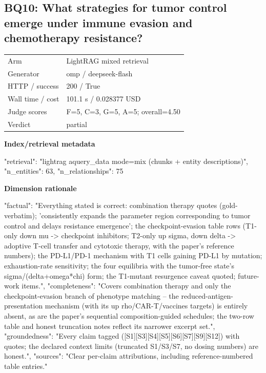 \documentclass[10pt]{article}
\begin{document}
\subsection{BQ10: What strategies for tumor control emerge under immune evasion and chemotherapy resistance?}
\begin{tabular}{@{}ll@{}}
Arm & LightRAG mixed retrieval\\
Generator & omp / deepseek-flash\\
HTTP / success & 200 / True\\
Wall time / cost & 101.1 s / 0.028377 USD\\
Judge scores & F=5, C=3, G=5, A=5; overall=4.50\\
Verdict & partial\\
\end{tabular}

\textbf{Index/retrieval metadata}
\begin{EvidenceText}
{
  "retrieval": "lightrag aquery_data mode=mix (chunks + entity descriptions)",
  "n_entities": 63,
  "n_relationships": 75
}
\end{EvidenceText}

\textbf{Dimension rationale}
\begin{EvidenceText}
{
  "factual": "Everything stated is correct: combination therapy quotes (gold-verbatim); 'consistently expands the parameter region corresponding to tumor control and delays resistance emergence'; the checkpoint-evasion table rows (T1-only down mu -> checkpoint inhibitors; T2-only up sigma, down delta -> adoptive T-cell transfer and cytotoxic therapy, with the paper's reference numbers); the PD-L1/PD-1 mechanism with T1 cells gaining PD-L1 by mutation; exhaustion-rate sensitivity; the four equilibria with the tumor-free state's sigma/(delta+omega*chi) form; the T1-mutant resurgence caveat quoted; future-work items.",
  "completeness": "Covers combination therapy and only the checkpoint-evasion branch of phenotype matching -- the reduced-antigen-presentation mechanism (with its up rho/CAR-T/vaccines targets) is entirely absent, as are the paper's sequential composition-guided schedules; the two-row table and honest truncation notes reflect its narrower excerpt set.",
  "groundedness": "Every claim tagged ([S1][S3][S4][S5][S6][S7][S9][S12]) with quotes; the declared context limits (truncated S1/S3/S7, no dosing numbers) are honest.",
  "sources": "Clear per-claim attributions, including reference-numbered table entries."
}
\end{EvidenceText}
\end{document}
